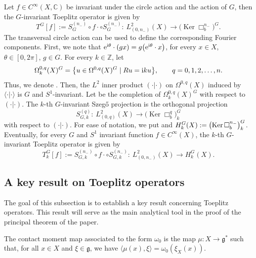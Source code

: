 \documentclass[10pt,a4paper]{amsart}
\numberwithin{equation}{section}
\newcommand{\To}{\rightarrow}
\begin{document}
	Let $f\in C^{\infty}(X, \mathbb{C})$ be invariant under the circle action and the action of $G$, then the $G$-invariant Toeplitz operator is given by
	\[T^G[f]:=S^{(n_-)}_G\circ f\cdot\circ S^{(n_-)}_G\colon\ L^2_{(0,n_-)}(X)\To\bigl(\operatorname{Ker}\Box^{n_-}_b\bigr)^G .
	\]
	The transversal circle action can be used to define the corresponding Fourier components. First, we note that
$
	{\rm e}^{{\rm i}\theta}\cdot (g x)=g \bigl( {\rm e}^{{\rm i}\theta}\cdot x\bigr)$, for every $ x\in X$, $ \theta\in[0,2\pi]$, $ g\in G$.
	For every $k\in\mathbb Z$, let
	\[\Omega^{0,q}_k(X)^G=\big\{u\in\Omega^{0,q}(X)^G \mid Ru={\rm i}k u\big\},\qquad q=0,1,2,\dots,n.
	\]
	Thus, we denote . Then, the $L^2$ inner product $( \cdot | \cdot )$ on $\Omega^{0,q}(X)$
	induced by~$\langle \cdot | \cdot \rangle$ is $G$ and $S^1$-invariant. Let  be
	the completion of $\Omega_k^{0,q}(X)^G$ with respect to~$( \cdot | \cdot )$.
	The $k$-th $G$-invariant Szeg\H{o} projection is the orthogonal projection
	\[S^{(q)}_{G,k}\colon\ L^2_{(0,q)}(X)\To \bigl(\operatorname{Ker}\Box^q_b\bigr)^G_k\]
	with respect to $( \cdot | \cdot )$. For ease of notation, we put
	and
$H^G_k(X):=\smash{\bigl(\operatorname{Ker}\Box^{n_-}_b\bigr)^G_k}$.
	Eventually, for every $G$ and $S^1$ invariant function $f\in{C}^\infty(X)$, the $k$-th $G$-invariant Toeplitz operator is given by
	\[%
		T^G_{k}[f]:=S^{(n_-)}_{G,k}\circ f\cdot\circ S^{(n_-)}_{G,k}\colon\ L^2_{(0,n_-)}(X)\To H^G_k(X) .
	\]
	
	 \subsection{A key result on Toeplitz operators}
	
	 The goal of this subsection is to establish a key result concerning Toeplitz operators. This result will serve as the main analytical tool in the proof of the principal theorem of the paper.
	
	 \begin{Definition}\label{d-gue170124}
	 	The contact moment map associated to the form $\omega_0$ is the map $\mu\colon X \to \mathfrak{g}^*$ such that, for all $x \in X$ and $\xi \in \mathfrak{g}$, we have
$\langle \mu(x), \xi \rangle = \omega_0(\xi_X(x))$.
	 \end{Definition}
\end{document}
